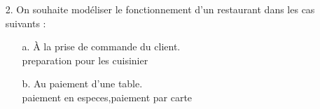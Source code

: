 \documentclass[12pt]{article}
\begin{document}
\begin{itemize}
\begin{itemize}
\begin{figure}[!hbtp]
			\end{figure}
		\end{itemize}
	\item[2. ] On souhaite modéliser le fonctionnement d’un restaurant dans les cas suivants :
	\begin{itemize}
		\item[a. ] À la prise de commande du client.\\preparation pour les cuisinier
		\item[b. ] Au paiement d’une table.\\paiement en especes,paiement par carte
	\end{itemize}
	\end{itemize}
\end{document}
